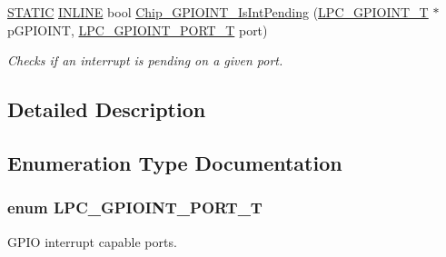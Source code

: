 \begin{DoxyCompactItemize}
\hyperlink{group__LPC__Types__Public__Macros_ga10b2d890d871e1489bb02b7e70d9bdfb}{S\-T\-A\-T\-I\-C} \hyperlink{group__LPC__Types__Public__Types_ga2eb6f9e0395b47b8d5e3eeae4fe0c116}{I\-N\-L\-I\-N\-E} bool \hyperlink{group__GPIOINT__17XX__40XX_gafd07acaafc8dda672add325845939fa3}{Chip\-\_\-\-G\-P\-I\-O\-I\-N\-T\-\_\-\-Is\-Int\-Pending} (\hyperlink{structLPC__GPIOINT__T}{L\-P\-C\-\_\-\-G\-P\-I\-O\-I\-N\-T\-\_\-\-T} $\ast$p\-G\-P\-I\-O\-I\-N\-T, \hyperlink{group__GPIOINT__17XX__40XX_ga41631ac5e33fde341c0afe680ded9fee}{L\-P\-C\-\_\-\-G\-P\-I\-O\-I\-N\-T\-\_\-\-P\-O\-R\-T\-\_\-\-T} port)
\begin{DoxyCompactList}\small\item\em Checks if an interrupt is pending on a given port. \end{DoxyCompactList}\end{DoxyCompactItemize}


\subsection{Detailed Description}


\subsection{Enumeration Type Documentation}
\hypertarget{group__GPIOINT__17XX__40XX_ga41631ac5e33fde341c0afe680ded9fee}{
\subsubsection[{L\-P\-C\-\_\-\-G\-P\-I\-O\-I\-N\-T\-\_\-\-P\-O\-R\-T\-\_\-\-T}]{\setlength{\rightskip}{0pt plus 5cm}enum {\bf L\-P\-C\-\_\-\-G\-P\-I\-O\-I\-N\-T\-\_\-\-P\-O\-R\-T\-\_\-\-T}}}\label{group__GPIOINT__17XX__40XX_ga41631ac5e33fde341c0afe680ded9fee}


G\-P\-I\-O interrupt capable ports. 


